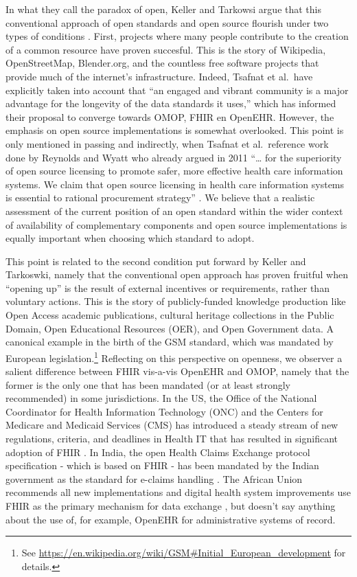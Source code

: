 \documentclass[
  authoryear]{elsarticle}
\begin{document}
In what they call the paradox of open, Keller and Tarkowsi argue that
this conventional approach of open standards and open source flourish
under two types of conditions \citep{keller2021paradox}. First, projects
where many people contribute to the creation of a common resource have
proven succesful. This is the story of Wikipedia, OpenStreetMap,
Blender.org, and the countless free software projects that provide much
of the internet's infrastructure. Indeed, Tsafnat et al.~have explicitly
taken into account that ``an engaged and vibrant community is a major
advantage for the longevity of the data standards it uses,'' which has
informed their proposal to converge towards OMOP, FHIR en OpenEHR.
However, the emphasis on open source implementations is somewhat
overlooked. This point is only mentioned in passing and indirectly, when
Tsafnat et al.~reference work done by Reynolds and Wyatt who already
argued in 2011 ``\ldots{} for the superiority of open source licensing
to promote safer, more effective health care information systems. We
claim that open source licensing in health care information systems is
essential to rational procurement strategy'' \citep{reynolds2011open}.
We believe that a realistic assessment of the current position of an
open standard within the wider context of availability of complementary
components and open source implementations is equally important when
choosing which standard to adopt.

This point is related to the second condition put forward by Keller and
Tarkoswki, namely that the conventional open approach has proven
fruitful when ``opening up'' is the result of external incentives or
requirements, rather than voluntary actions. This is the story of
publicly-funded knowledge production like Open Access academic
publications, cultural heritage collections in the Public Domain, Open
Educational Resources (OER), and Open Government data. A canonical
example in the birth of the GSM standard, which was mandated by European
legislation.\footnote{See
  \url{https://en.wikipedia.org/wiki/GSM\#Initial_European_development}
  for details.} Reflecting on this perspective on openness, we observer
a salient difference between FHIR vis-a-vis OpenEHR and OMOP, namely
that the former is the only one that has been mandated (or at least
strongly recommended) in some jurisdictions. In the US, the Office of
the National Coordinator for Health Information Technology (ONC) and the
Centers for Medicare and Medicaid Services (CMS) has introduced a steady
stream of new regulations, criteria, and deadlines in Health IT that has
resulted in significant adoption of FHIR \citep{firely2023fhir}. In
India, the open Health Claims Exchange protocol specification - which is
based on FHIR - has been mandated by the Indian government as the
standard for e-claims handling \citep{hcx}. The African Union recommends
all new implementations and digital health system improvements use FHIR
as the primary mechanism for data exchange \citep{tilahun2023african},
but doesn't say anything about the use of, for example, OpenEHR for
administrative systems of record.
\end{document}
